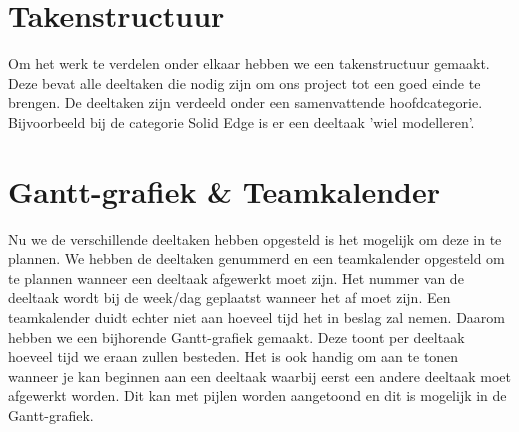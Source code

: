 \documentclass[a4paper,twoside,kulak]{kulakreport}
\begin{document}
	\section{Takenstructuur}Om het werk te verdelen onder elkaar hebben we een takenstructuur gemaakt. Deze bevat alle deeltaken die nodig zijn om ons project tot een goed einde te brengen. De deeltaken zijn verdeeld onder een samenvattende hoofdcategorie. Bijvoorbeeld bij de categorie Solid Edge is er een deeltaak 'wiel modelleren'. 
	\section{Gantt-grafiek \& Teamkalender} Nu we de verschillende deeltaken hebben opgesteld is het mogelijk om deze in te plannen. We hebben de deeltaken genummerd en een teamkalender opgesteld om te plannen wanneer een deeltaak afgewerkt moet zijn. Het nummer van de deeltaak wordt bij de week/dag geplaatst wanneer het af moet zijn. Een teamkalender duidt echter niet aan hoeveel tijd het in beslag zal nemen. Daarom hebben we een bijhorende Gantt-grafiek gemaakt. Deze toont per deeltaak hoeveel tijd we eraan zullen besteden. Het is ook handig om aan te tonen wanneer je kan beginnen aan een deeltaak waarbij eerst een andere deeltaak moet afgewerkt worden. Dit kan met pijlen worden aangetoond en dit is mogelijk in de Gantt-grafiek. 
	
\end{document}

